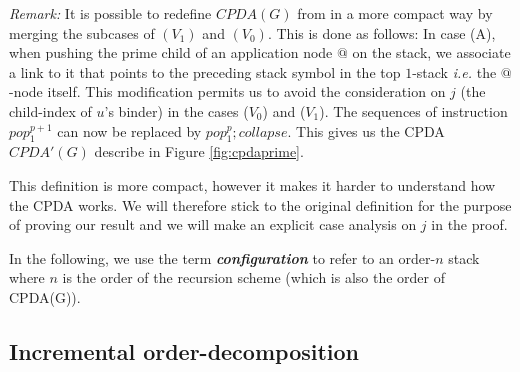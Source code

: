 \documentclass{article}
\newcommand\defname[1]{{\bf\em #1}\index{#1}}
\theoremstyle{remark}
\theoremstyle{definition}
\begin{document}
{\it Remark:} It is possible to redefine $CPDA(G)$ from
\cite{hague-sto07} in a more compact way by merging the subcases of
$(V_1)$ and $(V_0)$. This is done as follows: In case (A), when
pushing the prime child of an application node $@$ on the stack, we
associate a link to it that points to the preceding stack symbol in
the top $1$-stack {\it i.e.} the $@$-node itself.
 This modification permits us to avoid the consideration on $j$ (the child-index of $u$'s binder) in the
 cases ($V_0$) and ($V_1$). The sequences of instruction $pop_1^{p+1}$ can now be replaced by
 $pop_1^p ; collapse$. This gives us the CPDA $CPDA'(G)$ describe in
Figure \ref{fig:cpdaprime}.
\begin{figure}[htbp]
\begin{center}
\end{center}
\end{figure}
This definition is more compact, however it makes it harder to
understand how the CPDA works. We will therefore stick to the
original definition for the purpose of proving our result and we
will make an explicit case analysis on $j$ in the proof.

In the following, we use the term \defname{configuration} to refer to an order-$n$ stack where $n$ is the order
of the recursion scheme (which is also the order of CPDA(G)).


\subsection{Incremental order-decomposition}
\end{document}
